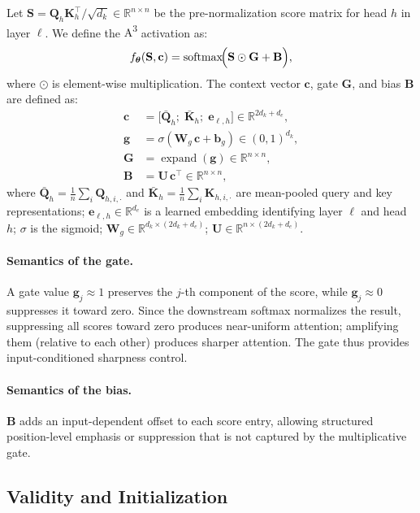 \documentclass[11pt]{article}
\newcommand{\softmax}{\operatorname{softmax}}
\newcommand{\AAA}{\textsc{A\textsuperscript{3}}}
\newcommand{\RR}{\mathbb{R}}
\newcommand{\btheta}{\boldsymbol{\theta}}
\newcommand{\bQ}{\mathbf{Q}}
\newcommand{\bK}{\mathbf{K}}
\newcommand{\bW}{\mathbf{W}}
\newcommand{\bS}{\mathbf{S}}
\newcommand{\bG}{\mathbf{G}}
\newcommand{\bB}{\mathbf{B}}
\newcommand{\bU}{\mathbf{U}}
\newcommand{\bc}{\mathbf{c}}
\newcommand{\be}{\mathbf{e}}
\newcommand{\bg}{\mathbf{g}}
\newcommand{\bb}{\mathbf{b}}
\begin{document}
Let $\bS = \bQ_h\bK_h^\top/\sqrt{d_k} \in \RR^{n \times n}$ be the pre-normalization score matrix for head $h$ in layer $\ell$. We define the \AAA{} activation as:
\begin{equation}
  f_{\btheta}(\bS, \bc)
    = \softmax\!\Bigl(\bS \odot \bG + \bB\Bigr),
  \label{eq:a3}
\end{equation}
where $\odot$ is element-wise multiplication. The context vector $\bc$, gate $\bG$, and bias $\bB$ are defined as:
\begin{align}
  \bc &= \bigl[\bar{\bQ}_h;\; \bar{\bK}_h;\; \be_{\ell,h}\bigr]
        \in \RR^{2d_k + d_e},
        \label{eq:ctx}\\
  \bg &= \sigma\!\left(\bW_g\,\bc + \bb_g\right)
        \in (0,1)^{d_k},
        \label{eq:gate}\\
  \bG &= \operatorname{expand}(\bg)
        \in \RR^{n \times n},
        \label{eq:G}\\
  \bB &= \bU\,\bc^\top
        \in \RR^{n \times n},
        \label{eq:B}
\end{align}
where $\bar{\bQ}_h = \frac{1}{n}\sum_i \bQ_{h,i,\cdot}$ and $\bar{\bK}_h = \frac{1}{n}\sum_i \bK_{h,i,\cdot}$ are mean-pooled query and key representations; $\be_{\ell,h} \in \RR^{d_e}$ is a learned embedding identifying layer $\ell$ and head $h$; $\sigma$ is the sigmoid; $\bW_g \in \RR^{d_k \times (2d_k + d_e)}$; $\bU \in \RR^{n \times (2d_k + d_e)}$.

\paragraph{Semantics of the gate.} A gate value $\bg_j \approx 1$ preserves the $j$-th component of the score, while $\bg_j \approx 0$ suppresses it toward zero. Since the downstream softmax normalizes the result, suppressing all scores toward zero produces near-uniform attention; amplifying them (relative to each other) produces sharper attention. The gate thus provides input-conditioned sharpness control.

\paragraph{Semantics of the bias.} $\bB$ adds an input-dependent offset to each score entry, allowing structured position-level emphasis or suppression that is not captured by the multiplicative gate.

\subsection{Validity and Initialization}
\end{document}
